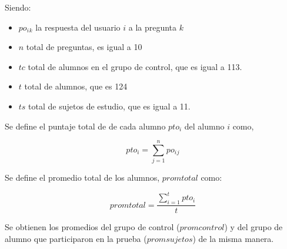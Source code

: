 Siendo:

\begin{itemize}
    \item $po_i{_k}$ la respuesta del usuario $i$ a la pregunta $k$
    \item $n$ total de preguntas, es igual a 10
    \item $tc$ total de alumnos en el grupo de control, que es igual a 113.
    \item $t$ total de alumnos, que es 124
    \item $ts$ total de sujetos de estudio, que es igual a 11.
\end{itemize}

Se define el puntaje total de de cada alumno $pto_i$ del alumno $i$ como, 

\begin{equation*}
    pto_i = \sum_{j=1}^n{po_i{_j}}
\end{equation*}

Se define el promedio total de los alumnos, $promtotal$ como:

\begin{equation*}
    promtotal = \frac{\sum_{i=1}^t{pto_i}}{t}
\end{equation*}

Se obtienen los promedios del grupo de control ($promcontrol$) y del grupo de alumno que
participaron en la prueba ($promsujetos$) de la misma manera.
